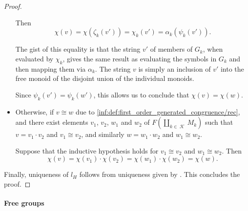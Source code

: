 \begin{proof}
\begin{itemize}
    Then
    \begin{equation*}
      \chi(v)
      =
      \chi(\zeta_k(v'))
      =
      \chi_k(v')
      =
      \alpha_k(\psi_k(v')).
    \end{equation*}

    The gist of this equality is that the string \( v' \) of members of \( G_k \), when evaluated by \( \chi_k \), gives the same result as evaluating the symbols in \( G_k \) and then mapping them via \( \alpha_k \). The string \( v \) is simply an inclusion of \( v' \) into the free monoid of the disjoint union of the individual monoids.

    Since \( \psi_k(v') = \psi_k(w') \), this allows us to conclude that \( \chi(v) = \chi(w) \).

    \item Otherwise, if \( v \cong w \) due to \ref{inf:def:first_order_generated_congruence/rec}, and there exist elements \( v_1 \), \( v_2 \), \( w_1 \) and \( w_2 \) of \( F(\coprod_{k \in \mscrK} M_k) \) such that \( v = v_1 \cdot v_2 \) and \( v_1 \cong v_2 \), and similarly \( w = w_1 \cdot w_2 \) and \( w_1 \cong w_2 \).

    Suppose that the inductive hypothesis holds for \( v_1 \cong v_2 \) and \( w_1 \cong w_2 \). Then
    \begin{equation*}
      \chi(v) = \chi(v_1) \cdot \chi(v_2) = \chi(w_1) \cdot \chi(w_2) = \chi(w).
    \end{equation*}
  \end{itemize}

  Finally, uniqueness of \( l_H \) follows from uniqueness given by . This concludes the proof.
\end{proof}

\paragraph{Free groups}

